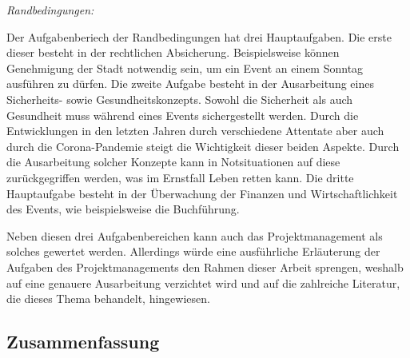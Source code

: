 \textit{Randbedingungen:}

Der Aufgabenberiech der Randbedingungen hat drei Hauptaufgaben.
Die erste dieser besteht in der rechtlichen Absicherung.
Beispielsweise können Genehmigung der Stadt notwendig sein, um ein Event an einem Sonntag ausführen zu dürfen.
Die zweite Aufgabe besteht in der Ausarbeitung eines Sicherheits- sowie Gesundheitskonzepts.
Sowohl die Sicherheit als auch Gesundheit muss während eines Events sichergestellt werden.
Durch die Entwicklungen in den letzten Jahren durch verschiedene Attentate aber auch durch die Corona-Pandemie steigt die Wichtigkeit dieser beiden Aspekte.
Durch die Ausarbeitung solcher Konzepte kann in Notsituationen auf diese zurückgegriffen werden, was im Ernstfall Leben retten kann.
Die dritte Hauptaufgabe besteht in der Überwachung der Finanzen und Wirtschaftlichkeit des Events, wie beispielsweise die Buchführung.

Neben diesen drei Aufgabenbereichen kann auch das Projektmanagement als solches gewertet werden.
Allerdings würde eine ausführliche Erläuterung der Aufgaben des Projektmanagements den Rahmen dieser Arbeit sprengen, weshalb auf eine genauere Ausarbeitung verzichtet wird und auf die zahlreiche Literatur, die dieses Thema behandelt, hingewiesen.

\subsection{Zusammenfassung}

